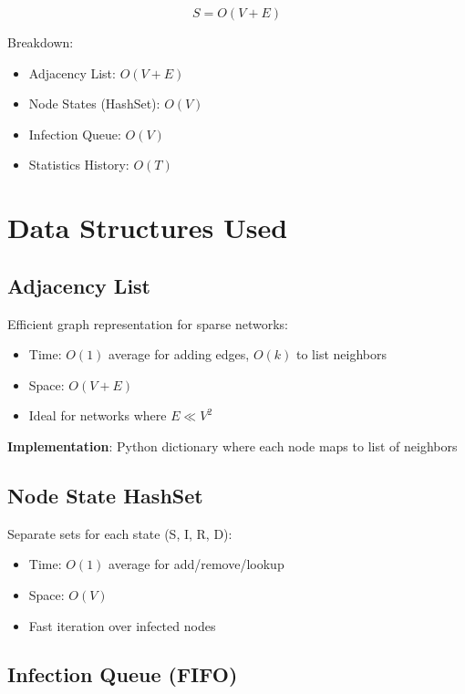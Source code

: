 \documentclass[12pt,a4paper]{article}
\begin{document}
\begin{equation}
S = O(V + E)
\end{equation}

Breakdown:
\begin{itemize}
    \item Adjacency List: $O(V + E)$
    \item Node States (HashSet): $O(V)$
    \item Infection Queue: $O(V)$
    \item Statistics History: $O(T)$
\end{itemize}

\section{Data Structures Used}

\subsection{Adjacency List}

Efficient graph representation for sparse networks:
\begin{itemize}
    \item Time: $O(1)$ average for adding edges, $O(k)$ to list neighbors
    \item Space: $O(V + E)$
    \item Ideal for networks where $E \ll V^2$
\end{itemize}

\textbf{Implementation}: Python dictionary where each node maps to list of neighbors

\subsection{Node State HashSet}

Separate sets for each state (S, I, R, D):
\begin{itemize}
    \item Time: $O(1)$ average for add/remove/lookup
    \item Space: $O(V)$
    \item Fast iteration over infected nodes
\end{itemize}

\subsection{Infection Queue (FIFO)}
\end{document}
